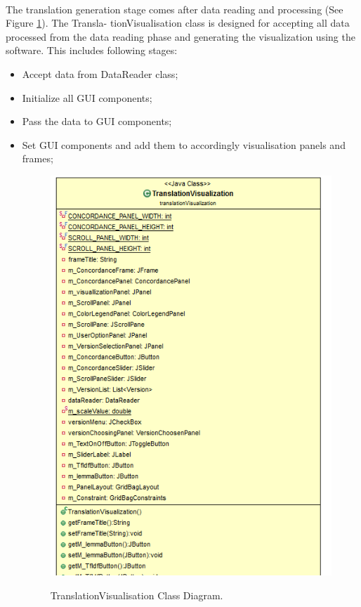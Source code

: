 \paragraph[]{}The translation generation stage comes after data reading and processing (See Figure \ref{fig:translationVisualisation}). The Transla- tionVisualisation class is designed for accepting all data processed from the data reading phase and generating the visualization using the software. This includes following stages:
\begin{itemize}
	\item \textbf{}Accept data from DataReader class;
	\item \textbf{}Initialize all GUI components;
	\item \textbf{}Pass the data to GUI components;
	\item \textbf{}Set GUI components and add them to accordingly visualisation panels and frames;
	
	\begin{figure}[H]
		\centering    
		\includegraphics[scale=0.9]{Figs/TranslationVisualisation}\\[1ex]
		\caption{TranslationVisualisation Class Diagram. }
		\label{fig:translationVisualisation}
	\end{figure}
	
\end{itemize}  

